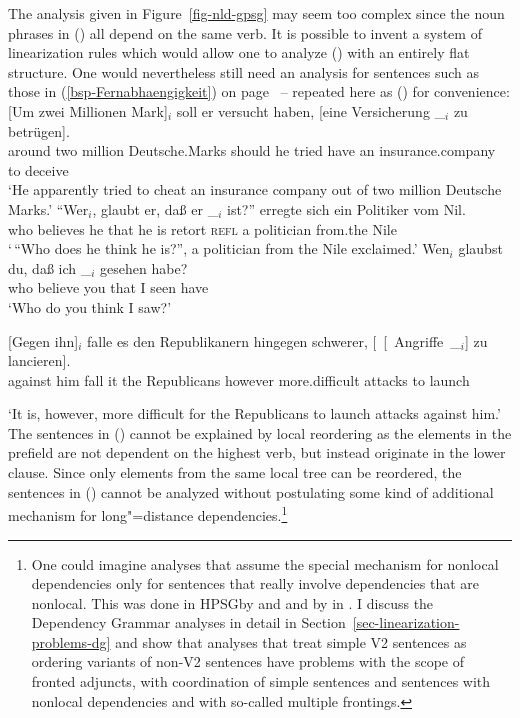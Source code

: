 The analysis given in Figure~\ref{fig-nld-gpsg} may seem too complex since the noun phrases in () all depend on the same verb. It is possible to invent a system
of linearization rules which would allow one to analyze () with an entirely flat
structure. One would nevertheless still need an analysis for sentences such as those in
(\ref{bsp-Fernabhaengigkeit}) on page~\pageref{bsp-Fernabhaengigkeit} -- repeated here as () for convenience:
\largerpage
\eal
\ex\label{bsp-um-zwei-millionen-zwei}
\gll {}[Um zwei Millionen Mark]$_i$ soll er versucht haben, [eine Versicherung \_$_i$ zu betrügen].\footnotemark\\
     {}\spacebr{}around two million Deutsche.Marks should he tried have \spacebr{}an insurance.company {} to deceive\\
\glt `He apparently tried to cheat an insurance company out of two million Deutsche Marks.'
\ex
\gll "`Wer$_i$, glaubt er, daß er \_$_i$ ist?"' erregte sich ein Politiker vom Nil.\footnotemark\\
     \spacebr{}who believes he that he {} is retort \textsc{refl} a politician from.the Nile\\
\glt `\,``Who does he think he is?'', a politician from the Nile exclaimed.'
\ex\label{ex-wen-glaubst-du-dass-zwei}
\gll Wen$_i$ glaubst du, daß ich \_$_i$ gesehen habe?\footnotemark\\
     who believe you that I {} seen have\\
\glt `Who do you think I saw?'
\ex
{\raggedright
\gll {}[Gegen ihn]$_i$ falle es den Republikanern hingegen schwerer, [~[~Angriffe~\_$_i$] zu lancieren].\footnotemark\\
	 {}\spacebr{}against him fall it the Republicans however more.difficult
         \hspaceThis{[~[~}attacks to launch\\
\par}
\glt `It is, however, more difficult for the Republicans to launch attacks against him.'
\zl
The sentences in () cannot be explained by local reordering as the elements in the prefield are not dependent on the highest verb, but instead originate in the lower clause.
Since only elements from the same local tree can be reordered, the sentences in () cannot be analyzed without postulating some kind of additional mechanism for long"=distance
dependencies.\footnote{%
  One could imagine analyses that assume the special mechanism for nonlocal dependencies only for
  sentences that really involve dependencies that are nonlocal. This was done in HPSG\indexhpsg by
  \citet{Kathol95a} and \citet{Wetta2011a} and by \citet{GO2009a} in \dg. I discuss the Dependency
  Grammar analyses in detail in Section~\ref{sec-linearization-problems-dg} and show that analyses
  that treat simple V2 sentences as ordering variants of non-V2 sentences have problems with the scope of
  fronted adjuncts, with coordination of simple sentences and sentences with nonlocal dependencies
  and with so-called multiple frontings.
}


